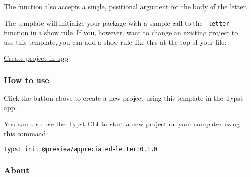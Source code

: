 The function also accepts a single, positional argument for the body of
the letter.

The template will initialize your package with a sample call to the
\texttt{\ letter\ } function in a show rule. If you, however, want to
change an existing project to use this template, you can add a show rule
like this at the top of your file:

\begin{Shaded}
\begin{Highlighting}[]

\NormalTok{  sender: [}
\NormalTok{  ],}
\NormalTok{  recipient: [}
\NormalTok{  ],}
\NormalTok{)}



\end{Highlighting}
\end{Shaded}

\href{/app?template=appreciated-letter&version=0.1.0}{Create project in
app}

\subsubsection{How to use}\label{how-to-use}

Click the button above to create a new project using this template in
the Typst app.

You can also use the Typst CLI to start a new project on your computer
using this command:

\begin{verbatim}
typst init @preview/appreciated-letter:0.1.0
\end{verbatim}



\subsubsection{About}\label{about}

